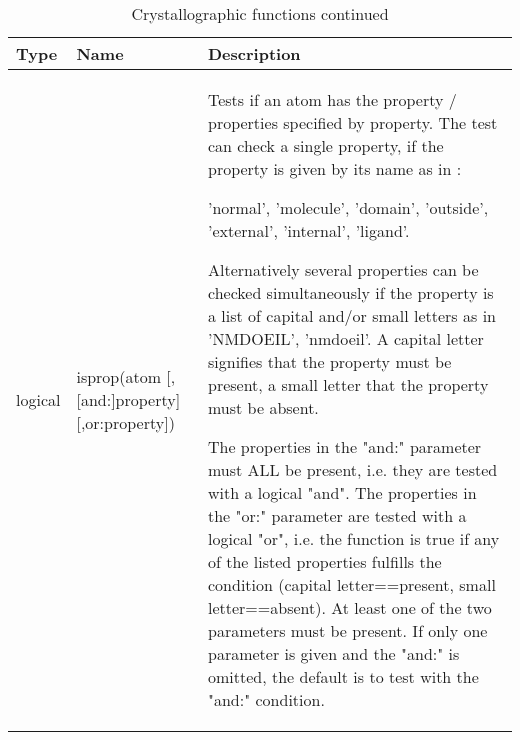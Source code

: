 \begin{table}[!tbh]
\begin{tabularx}{\textwidth}{|p{10mm}|p{47mm}|X|}
  \hline
  {\bf Type} & {\bf Name} & {\bf Description} \\
  \hline\hline
   logical & \raggedright isprop(atom [,[and:]property] [,or:property]) &
       Tests if an atom has the property / properties specified by
       property. The test can check a single property, if the 
       property is given by its name as in :

       'normal', 'molecule', 'domain', 'outside', 'external', 'internal',
       'ligand'. 

       Alternatively several properties can be checked 
       simultaneously if the property is a list of capital and/or 
       small letters as in 'NMDOEIL', 'nmdoeil'. A capital letter 
       signifies that the property must be present, a small letter 
       that the property must be absent. 

       The properties in the "and:" parameter must ALL be present, 
       i.e. they are tested with a logical "and". The properties in
       the "or:" parameter are tested with a logical "or", i.e. the
       function is true if any of the listed properties fulfills
       the condition (capital letter==present, small letter==absent).
       At least one of the two parameters must be present. If only 
       one parameter is given and the "and:" is omitted, the default
       is to test with the "and:" condition. \\
  \hline
\end{tabularx}
\caption{\label{func-cryst2}Crystallographic functions continued}
\end{table}


